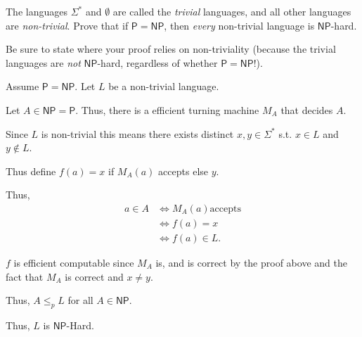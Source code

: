 \documentclass[12pt, letterpaper]{article}
\renewcommand{\P}{\mathsf{P}}
\newcommand{\NP}{\mathsf{NP}}
\renewcommand{\t}[1]{\text{#1}}
\begin{document}
\begin{subproblem}{}
    The languages $\Sigma^*$ and $\emptyset$ are called the \emph{trivial} languages, and all other languages are \emph{non-trivial}.
    Prove that if $\P = \NP$, then \emph{every} non-trivial language is $\NP$-hard.

    Be sure to state where your proof relies on non-triviality (because the trivial languages are \emph{not} $\NP$-hard, regardless of whether $\P=\NP$!). 
\end{subproblem}
\begin{problemproof}
    Assume $\P=\NP$. Let $L$ be a non-trivial language.

    Let $A \in \NP = \P$. Thus, there is a efficient turning machine $M_A$ that decides $A$.
    
    Since $L$ is non-trivial this means there exists distinct $x,y \in \Sigma^*$ s.t. $x \in L$ and $y \notin L$.

    Thus define $f(a)=x$ if $M_A(a)$ accepts else $y$.

    Thus,
    \begin{align*}
        a \in A &\iff M_A(a) \t{accepts}\\
                &\iff f(a)=x\\
                &\iff f(a) \in L.
    \end{align*}

    $f$ is efficient computable since $M_A$ is, and is correct by the proof above and the fact that $M_A$ is correct and $x\neq y$.

    Thus, $A \leq_p L$ for all $A \in \NP$.

    Thus, $L$ is $\NP$-Hard.
\end{problemproof}
\newcommand{\DomSet}{\textsc{Dominating-Set}}
\end{document}
